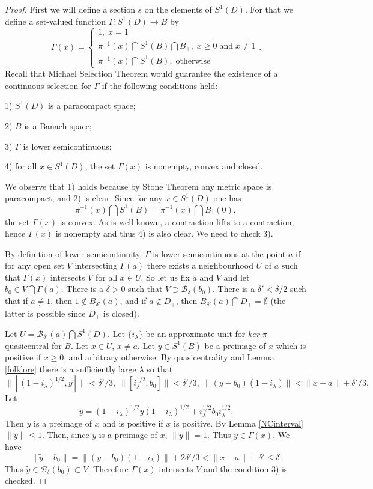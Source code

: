 \documentclass{article}%
\begin{document}
\begin{proof}
First we will define  a section $s$ on the elements of $S^1(D)$. For that we define  a set-valued function $\Gamma: S^1(D)\to B$ by
$$\Gamma(x) = \begin{cases} 1, \; x=1 \\ \pi^{-1}(x) \bigcap S^1(B) \bigcap B_{+}, \; x\ge 0 \; \text{and} \; x\neq 1 \\  \pi^{-1}(x) \bigcap S^1(B), \; \text{otherwise}
\end{cases}.$$ Recall that Michael Selection Theorem would guarantee the existence of a continuous selection for $\Gamma$ if the following conditions held:

1) $S^1(D)$ is a paracompact space;

2) $B$  is a Banach space;

3) $\Gamma$  is lower semicontinuous;

4) for all $x\in S^1(D)$, the set $\Gamma(x)$ is nonempty, convex and closed.


 \noindent We observe that 1) holds because by Stone Theorem any metric space is paracompact,  and 2) is clear.
 Since for any $x\in S^1(D)$  one has $$\pi^{-1}(x) \bigcap S^1(B) = \pi^{-1}(x) \bigcap B_1(0),$$ the set $\Gamma(x)$ is convex.  As  is well known, a contraction lifts to a contraction, hence $\Gamma(x)$ is nonempty and thus 4) is also clear. We need to check 3).

 By definition of lower semicontinuity, $\Gamma$ is lower semicontinuous  at the point  $a$ if for any open set $V$ intersecting $\Gamma(a)$ there exists a neighbourhood $U$ of $a$ such that
$\Gamma(x)$ intersects  $V$ for all $x\in U$. So let us fix $a$ and $V$ and let $b_0 \in V\bigcap \Gamma(a)$.  There is a $\delta > 0$ such that $V\supset \mathcal B_{\delta}(b_0)$. There is a  $\delta' < \delta/2$ such that if $a\neq 1$, then $1\notin B_{\delta'}(a)$, and if $a\notin D_{+}$, then
$B_{\delta'}(a) \bigcap D_{+} = \emptyset$ (the latter is possible since $D_{+}$ is closed).

Let $U = \mathcal B_{\delta'}(a)\bigcap S^1(D)$. Let $\{i_{\lambda}\}$ be an approximate unit for $ker \;\pi$ quasicentral for $B$. Let  $x\in U$, $x\neq a$. Let $y\in S^1(B)$ be a preimage of $x$ which is positive if $x\ge 0$, and arbitrary otherwise.  By quasicentrality and Lemma \ref{folklore} there is a   sufficiently large   $\lambda$ so that
$$\|[(1-i_{\lambda})^{1/2}, y]\|< \delta'/3, \; \|[i_{\lambda}^{1/2}, b_0]\|< \delta'/3, \; \|(y-b_0)(1-i_{\lambda})\|< \|x-a\| + \delta'/3.$$
Let
$$\tilde y =  (1-i_{\lambda})^{1/2}y(1-i_{\lambda})^{1/2} + i_{\lambda}^{1/2}b_0i_{\lambda}^{1/2}.$$  Then $\tilde y$ is a preimage of $x$ and is positive if $x$ is positive. By Lemma \ref{NCinterval} $\|\tilde y\| \le 1$. Then, since $\tilde y$ is a preimage of $x$,  $\|\tilde y\| = 1$. Thus  $\tilde y \in \Gamma(x)$. We have
$$\|\tilde y - b_0\| = \|(y-b_0)(1-i_{\lambda})\| + 2\delta'/3 < \|x - a\| + \delta' \le \delta.$$ Thus $\tilde y \in \mathcal B_{\delta}(b_0)\subset V$. Therefore $\Gamma(x)$ intersects $V$ and the condition 3) is checked.


\end{proof}
\end{document}
